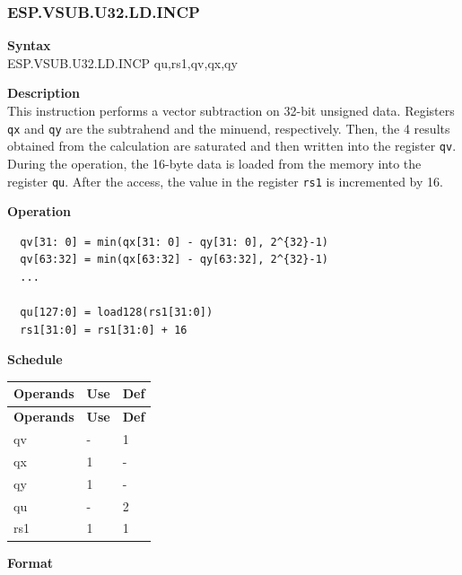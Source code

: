 \newpage
\subsubsection{ESP.VSUB.U32.LD.INCP}\label{instruction:ESPVSUBU32LDINCP}
\textbf{Syntax}\\
ESP.VSUB.U32.LD.INCP qu,rs1,qv,qx,qy

\textbf{Description}\\
This instruction performs a vector subtraction on 32-bit unsigned data. Registers \lstinline{qx} and \lstinline{qy} are the subtrahend and the minuend, respectively. Then, the 4 results obtained from the calculation are saturated and then written into the register \lstinline{qv}. \\ During the operation, the 16-byte data is loaded from the memory into the register \lstinline{qu}. After the access, the value in the register \lstinline{rs1} is incremented by 16.

\textbf{Operation}\\
\begin{lstlisting}
  qv[31: 0] = min(qx[31: 0] - qy[31: 0], 2^{32}-1)
  qv[63:32] = min(qx[63:32] - qy[63:32], 2^{32}-1)
  ...

  qu[127:0] = load128(rs1[31:0])
  rs1[31:0] = rs1[31:0] + 16
\end{lstlisting}

\textbf{Schedule}\\
\begin{longtable}[c]{|l|l|l|}
    \hline
    \rowcolor{lightgray}
    \textbf{Operands} & \textbf{Use} & \textbf{Def} \\\hline
    \endfirsthead
    \hline
    \rowcolor{lightgray}
     \textbf{Operands} & \textbf{Use} & \textbf{Def} \\\hline
    \endhead
    \hline
    \endfoot

  qv & - & 1 \\\hline
    qx & 1 & - \\\hline
    qy & 1 & - \\\hline
    qu & - & 2 \\\hline
    rs1 & 1 & 1

\end{longtable}

\textbf{Format}\\


